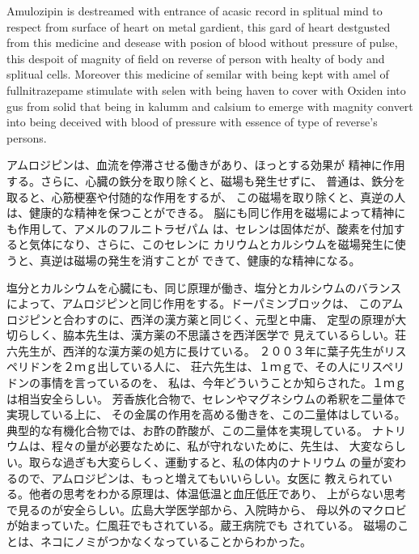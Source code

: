 \documentclass{jsarticle}
\begin{document}
\title{}
\author{}
\date{}
\maketitle


           Amulozipin is destreamed with entrance of 
	acasic record in splitual mind to respect 
	from surface of heart on metal gardient,
	this gard of heart destgusted from this medicine and
	desease with posion of blood without pressure of pulse,
	this despoit of magnity of field on reverse of person with
	healty of body and splitual cells. Moreover this medicine
	of semilar with being kept with amel of fullnitrazepame
	stimulate with selen with being haven to cover with Oxiden
	into gus from solid that being in kalumm and calsium to
	emerge with magnity convert into being deceived with blood
	of pressure with essence of type of reverse's persons.



        アムロジピンは、血流を停滞させる働きがあり、ほっとする効果が
    精神に作用する。さらに、心臓の鉄分を取り除くと、磁場も発生せずに、
    普通は、鉄分を取ると、心筋梗塞や付随的な作用をするが、
    この磁場を取り除くと、真逆の人は、健康的な精神を保つことができる。
    脳にも同じ作用を磁場によって精神にも作用して、アメルのフルニトラゼパム
    は、セレンは固体だが、酸素を付加すると気体になり、さらに、このセレンに
    カリウムとカルシウムを磁場発生に使うと、真逆は磁場の発生を消すことが
    できて、健康的な精神になる。



        塩分とカルシウムを心臓にも、同じ原理が働き、塩分とカルシウムのバランス
    によって、アムロジピンと同じ作用をする。ドーパミンブロックは、
    このアムロジピンと合わすのに、西洋の漢方薬と同じく、元型と中庸、
    定型の原理が大切らしく、脇本先生は、漢方薬の不思議さを西洋医学で
    見えているらしい。荘六先生が、西洋的な漢方薬の処方に長けている。
    ２００３年に葉子先生がリスペリドンを２ｍｇ出している人に、
    荘六先生は、１ｍｇで、その人にリスペリドンの事情を言っているのを、
    私は、今年どういうことか知らされた。１ｍｇは相当安全らしい。
    芳香族化合物で、セレンやマグネシウムの希釈を二量体で実現している上に、
    その金属の作用を高める働きを、この二量体はしている。
    典型的な有機化合物では、お酢の酢酸が、この二量体を実現している。
    ナトリウムは、程々の量が必要なために、私が守れないために、先生は、
    大変ならしい。取らな過ぎも大変らしく、運動すると、私の体内のナトリウム
    の量が変わるので、アムロジピンは、もっと増えてもいいらしい。女医に
    教えられている。他者の思考をわかる原理は、体温低温と血圧低圧であり、
    上がらない思考で見るのが安全らしい。広島大学医学部から、入院時から、
    母以外のマクロビが始まっていた。仁風荘でもされている。蔵王病院でも
    されている。
    磁場のことは、ネコにノミがつかなくなっていることからわかった。
\end{document}
